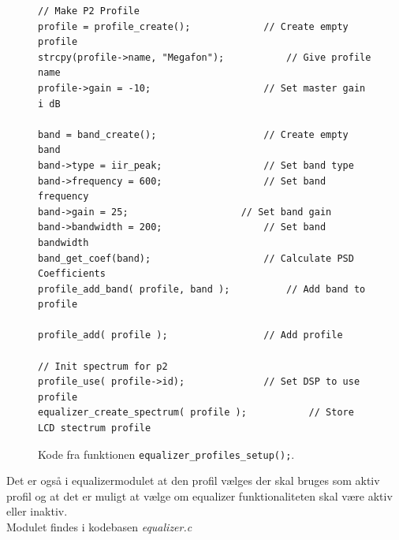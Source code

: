 \begin{figure}[h!]
\centering
{}
\begin{lstlisting}
// Make P2 Profile
profile = profile_create();				// Create empty profile
strcpy(profile->name, "Megafon");			// Give profile name
profile->gain = -10;					// Set master gain i dB

band = band_create();					// Create empty band
band->type = iir_peak;					// Set band type
band->frequency = 600;					// Set band frequency
band->gain = 25;					// Set band gain
band->bandwidth = 200;					// Set band bandwidth
band_get_coef(band);					// Calculate PSD Coefficients
profile_add_band( profile, band );			// Add band to profile

profile_add( profile );					// Add profile

// Init spectrum for p2
profile_use( profile->id);				// Set DSP to use profile
equalizer_create_spectrum( profile );			// Store LCD stectrum profile
\end{lstlisting}
\caption{Kode fra funktionen \texttt{equalizer\_profiles\_setup();}.}
\label{lst:eq_profil_setup}
\end{figure}


Det er også i equalizermodulet at den profil vælges der skal bruges som aktiv profil og at det er muligt at vælge om equalizer funktionaliteten skal være aktiv eller inaktiv.\\

Modulet findes i kodebasen \textit{equalizer.c}


  




